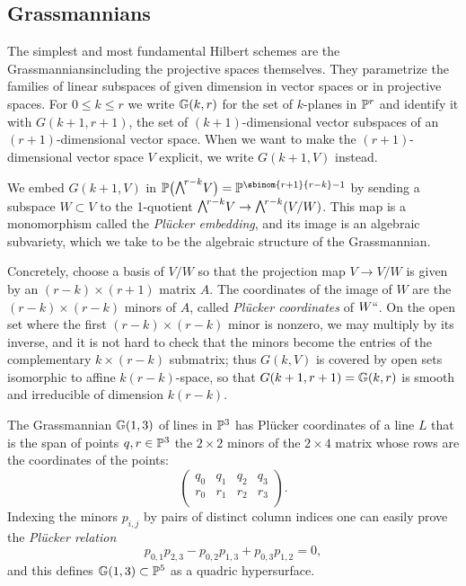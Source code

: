 \subsection{Grassmannians}
\label{Grassmannian section}

The
simplest and most fundamental
Hilbert schemes are the
Grassmannians\emdash including the projective spaces themselves.
%
They
\null
parametrize the families of linear subspaces of given dimension in
vector spaces or in projective spaces.
For $0\leq k\leq r$ we write ${\mathbb G}(k,r)$ for the set of $k$-planes in
%
${\mathbb P}^{r}$ and identify it with
$G(k+1,r+1)$, the set of $(k+1)$-dimensional vector subspaces of an
$(r+1)$-dimensional vector space.
When we want to make the $(r+1)$-dimensional vector space $V$ explicit,
we write $G(k+1, V)$ instead.

We embed $G(k+1,V)$ in $\PP\bigl(\mwedge^{r-k}V\bigr)
= \PP^{\sbinom{r+1}{r-k}-1}$
by sending a subspace $W\subset V$ to the 1-quotient $\mwedge
\vbox to 7.5pt{}^{r-k}V \to
\mwedge\vbox to 7.5pt{}^{r-k}(V/W)$.
This map is a monomorphism called the \emph{Pl\"ucker
%
embedding}, and its image is an algebraic subvariety, which we take to
be the algebraic structure
of the Grassmannian.
{\meshing[-3pt]\par}

Concretely,
choose a basis of $V/W$ so that the projection map $V \to V/W$ is
given by an $(r-k)\times (r+1)$
matrix $A$. The coordinates of the image of $W$ are the $(r-k)\times
(r-k)$ minors of $A$,
called \emph{Pl\"ucker coordinates} of $W` `$. On the open set where
%
the first $(r-k)\times (r-k)$
minor is nonzero, we may multiply by its inverse, and it is not hard to
check that the
minors become the entries of the complementary $k \times (r-k)$
submatrix; thus
 $G(k,V)$ is covered by open sets isomorphic to affine $k(r-k)$-space,
so that
$G(k+1,r+1) = {\mathbb G}(k,r)$ is smooth and
 irreducible of dimension $k(r-k)$.

\begin{example}
The Grassmannian ${\mathbb G}(1,3)$ of lines in ${\mathbb P}^{3}$ has Pl\"ucker
coordinates of a line
$L$ that is the span of points $q,r\in {\mathbb P}^{3}$ the $2\times 2$ minors
of the $2\times 4$ matrix
whose rows are the coordinates of the points:
$$
\begin{pmatrix}
q_{0}&q_{1}&q_{2}&q_{3}\\
r_{0}&r_{1}&r_{2}&r_{3}\\
\end{pmatrix}
.
$$
Indexing the minors $p_{i,j}$ by pairs of distinct column indices one
can easily prove the
\emph{Pl\"ucker relation}
%
$$
p_{0,1}p_{2,3} - p_{0,2}p_{1,3}+p_{0,3}p_{1,2} = 0,
$$
and this defines ${\mathbb G}(1,3)\subset {\mathbb P}^{5}$ as a quadric hypersurface.
\end{example}

